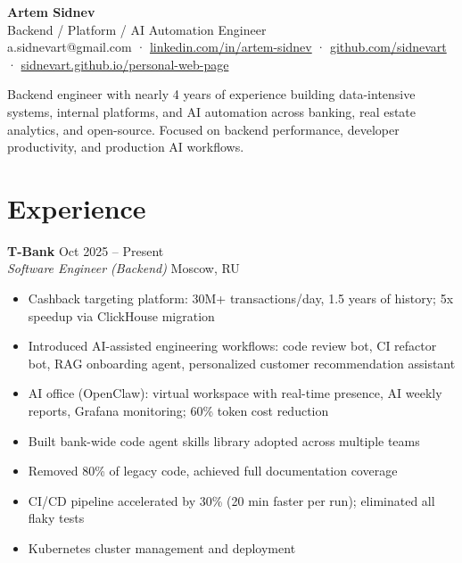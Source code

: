 \documentclass[11pt,a4paper]{article}
\newcommand{\cventry}[4]{%
  \noindent\textbf{#1} \hfill \textcolor{muted}{\small #2}\\[-2pt]
  \textit{#3} \hfill \textcolor{muted}{\small #4}\\[2pt]
}
\begin{document}
\begin{center}
  {\Huge\bfseries\color{accent} Artem Sidnev}\\[4pt]
  {\large Backend / Platform / AI Automation Engineer}\\[6pt]
  \textcolor{muted}{%
    a.sidnevart@gmail.com \quad·\quad
    \href{https://linkedin.com/in/artem-sidnev}{linkedin.com/in/artem-sidnev} \quad·\quad
    \href{https://github.com/sidnevart}{github.com/sidnevart} \quad·\quad
    \href{https://sidnevart.github.io/personal-web-page}{sidnevart.github.io/personal-web-page}
  }
\end{center}

\vspace{4pt}

Backend engineer with nearly 4 years of experience building data-intensive systems, internal platforms, and AI automation across banking, real estate analytics, and open-source. Focused on backend performance, developer productivity, and production AI workflows.

\section{Experience}

\cventry{T-Bank}{Oct 2025 – Present}{Software Engineer (Backend)}{Moscow, RU}
\begin{itemize}
  \item Cashback targeting platform: 30M+ transactions/day, 1.5 years of history; 5x speedup via ClickHouse migration
  \item Introduced AI-assisted engineering workflows: code review bot, CI refactor bot, RAG onboarding agent, personalized customer recommendation assistant
  \item AI office (OpenClaw): virtual workspace with real-time presence, AI weekly reports, Grafana monitoring; 60\% token cost reduction
  \item Built bank-wide code agent skills library adopted across multiple teams
  \item Removed 80\% of legacy code, achieved full documentation coverage
  \item CI/CD pipeline accelerated by 30\% (20 min faster per run); eliminated all flaky tests
  \item Kubernetes cluster management and deployment
\end{itemize}

\vspace{4pt}
\end{document}
